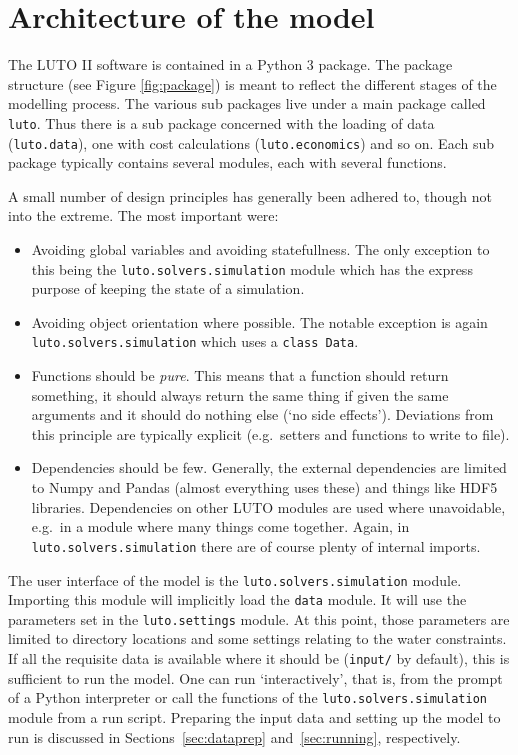 \documentclass{draft}
\begin{document}
\section{Architecture of the model}
The LUTO II software is contained in a Python 3 package. The package structure (see Figure \ref{fig:package}) is meant to reflect the different stages of the modelling process. The various sub packages live under a main package called \texttt{luto}. Thus there is a sub package concerned with the loading of data (\texttt{luto.data}), one with cost calculations (\texttt{luto.economics}) and so on. Each sub package typically contains several modules, each with several functions.

A small number of design principles has generally been adhered to, though not into the extreme. The most important were:
\begin{itemize}
	\item Avoiding global variables and avoiding statefullness. The only exception to this being the \texttt{luto.solvers.simulation} module which has the express purpose of keeping the state of a simulation.
	\item Avoiding object orientation where possible. The notable exception is again \texttt{luto.solvers.simulation} which uses a \texttt{class Data}.
	\item Functions should be \emph{pure}. This means that a function should return something, it should always return the same thing if given the same arguments and it should do nothing else (`no side effects'). Deviations from this principle are typically explicit (e.g.\ setters and functions to write to file).
	\item Dependencies should be few. Generally, the external dependencies are limited to Numpy and Pandas (almost everything uses these) and things like HDF5 libraries. Dependencies on other LUTO modules are used where unavoidable, e.g.\ in a module where many things come together. Again, in \texttt{luto.solvers.simulation} there are of course plenty of internal imports.
\end{itemize}

The user interface of the model is the \texttt{luto.solvers.simulation} module. Importing this module will implicitly load the \texttt{data} module. It will use the parameters set in the \texttt{luto.settings} module. At this point, those parameters are limited to directory locations and some settings relating to the water constraints. If all the requisite data is available where it should be (\texttt{input/} by default), this is sufficient to run the model. One can run `interactively', that is, from the prompt of a Python interpreter or call the functions of the \texttt{luto.solvers.simulation} module from a run script. Preparing the input data and setting up the model to run is discussed in Sections~\ref{sec:dataprep} and~\ref{sec:running}, respectively.
\end{document}
